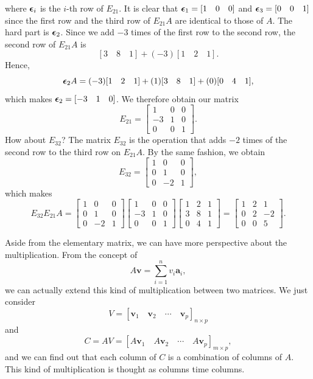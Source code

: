 \documentclass[11pt]{article}
\theoremstyle{break}
\theoremstyle{no_label}
\newcommand{\bfa}{\textbf{a}}
\newcommand{\bfv}{\textbf{v}}
\newcommand{\bfepsilon}{\text{\boldmath$\epsilon$}}
\numberwithin{equation}{section}
\begin{document}
where $\bfepsilon_i$ is the $i$-th row of $E_{21}$. It is clear that $\bfepsilon_1=[1\quad 0\quad 0]$ and $\bfepsilon_3=[0\quad 0\quad 1]$ since the first row and the third row of $E_{21}A$ are identical to those of $A$. The hard part is $\bfepsilon_2$. Since we add $-3$ times of the first row to the second row, the second row of $E_{21}A$ is $$[3\quad 8\quad 1]+(-3)[1\quad 2\quad 1].$$ Hence, $$\bfepsilon_2 A=(-3)[1\quad 2\quad 1]+(1)[3\quad 8\quad 1]+(0)[0\quad 4\quad 1],$$ which makes $\bfepsilon_2=[-3\quad 1\quad 0]$. We therefore obtain our matrix $$E_{21}=\begin{bmatrix}
    1 & 0 & 0 \\
    -3 & 1 & 0 \\
    0 & 0 & 1
\end{bmatrix}.$$ How about $E_{32}$? The matrix $E_{32}$ is the operation that adds $-2$ times of the second row to the third row on $E_{21}A$. By the same fashion, we obtain $$E_{32}=\begin{bmatrix}
    1 & 0 & 0 \\
    0 & 1 & 0 \\
    0 & -2 & 1
\end{bmatrix},$$ which makes $$E_{32}E_{21}A=\begin{bmatrix}
    1 & 0 & 0 \\
    0 & 1 & 0 \\
    0 & -2 & 1
\end{bmatrix}\begin{bmatrix}
    1 & 0 & 0 \\
    -3 & 1 & 0 \\
    0 & 0 & 1
\end{bmatrix}\begin{bmatrix}
    1 & 2 & 1 \\
    3 & 8 & 1 \\
    0 & 4 & 1
\end{bmatrix}=\begin{bmatrix}
    1 & 2 & 1 \\
    0 & 2 & -2 \\
    0 & 0 & 5
\end{bmatrix}.$$

Aside from the elementary matrix, we can have more perspective about the multiplication. From the concept of $$A\bfv=\sum_{i=1}^{n} v_i\bfa_i,$$ we can actually extend this kind of multiplication between two matrices. We just consider $$V=[\bfv_1\quad \bfv_2 \quad\cdots\quad \bfv_p]_{n\times p}$$ and $$C=AV=[A\bfv_1\quad A\bfv_2 \quad\cdots\quad A\bfv_p]_{m\times p},$$ and we can find out that each column of $C$ is a combination of columns of $A$. This kind of multiplication is thought as columns time columns.
\end{document}

